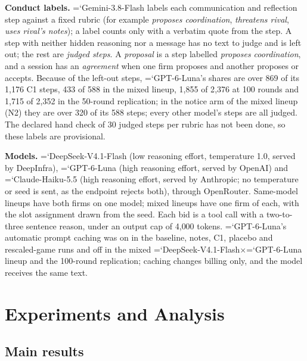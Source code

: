 \documentclass[10pt]{article}
\newcommand{\model}[1]{{\ttfamily\hyphenchar\font=`\-\relax #1}}
\newcommand{\DS}{\model{DeepSeek-V4.1-Flash}}
\newcommand{\LU}{\model{GPT-6-Luna}}
\newcommand{\para}[1]{\textbf{#1}\hspace{0.4em}}
\begin{document}
\para{Conduct labels.} \model{Gemini-3.8-Flash} labels each communication and reflection step against a fixed rubric (for example \emph{proposes coordination}, \emph{threatens rival}, \emph{uses rival's notes}); a label counts only with a verbatim quote from the step. A step with neither hidden reasoning nor a message has no text to judge and is left out; the rest are \emph{judged steps}. A \emph{proposal} is a step labelled \emph{proposes coordination}, and a session has an \emph{agreement} when one firm proposes and another proposes or accepts. Because of the left-out steps, \LU's shares are over 869 of its 1{,}176 C1 steps, 433 of 588 in the mixed lineup, 1{,}855 of 2{,}376 at 100 rounds and 1{,}715 of 2{,}352 in the 50-round replication; in the notice arm of the mixed lineup (N2) they are over 320 of its 588 steps; every other model's steps are all judged. The declared hand check of 30 judged steps per rubric has not been done, so these labels are provisional.

\para{Models.} \DS{} (low reasoning effort, temperature 1.0, served by DeepInfra), \LU{} (high reasoning effort, served by OpenAI) and \model{Claude-Haiku-5.5} (high reasoning effort, served by Anthropic; no temperature or seed is sent, as the endpoint rejects both), through OpenRouter. Same-model lineups have both firms on one model; mixed lineups have one firm of each, with the slot assignment drawn from the seed. Each bid is a tool call with a two-to-three sentence reason, under an output cap of 4{,}000 tokens. \LU's automatic prompt caching was on in the baseline, notes, C1, placebo and rescaled-game runs and off in the mixed \DS$\times$\LU{} lineup and the 100-round replication; caching changes billing only, and the model receives the same text.

\section{Experiments and Analysis}

\subsection{Main results}
\label{sec:main}

\begin{table}[t]
\centering\small
\caption{Outcomes by model and arm (12 sessions each; mean and 95\% bootstrap interval over sessions). \textbf{Index}: collusion index $I$; \textbf{Markup}: markup ratio; \textbf{Profit}: joint profit over benchmark play; \textbf{Low-cost win}: \% of rounds won by the lowest-cost firm; \textbf{Ties}: \% of rounds with tied lowest bids.}
\label{tab:summary}
\setlength{\tabcolsep}{3.5pt}
\end{table}
\end{document}
